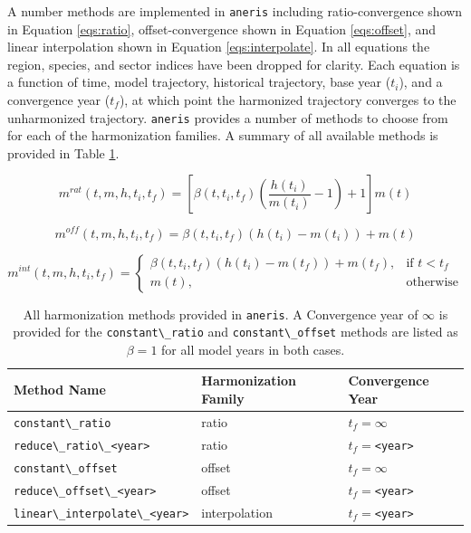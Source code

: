 \documentclass[review]{elsarticle}
\newcommand{\code}[1]{\lstinline[basicstyle=\ttfamily\color{black}]|#1|}
\newcommand{\codeb}[1]{\texttt{#1}}
\begin{document}
A number  methods are implemented in \code{aneris} including
ratio-convergence shown in Equation \ref{eqs:ratio}, offset-convergence shown in
Equation \ref{eqs:offset}, and linear interpolation shown in Equation
\ref{eqs:interpolate}. In all equations the region, species, and sector indices
have been dropped for clarity. Each equation is a function of time, model
trajectory, historical trajectory, base year ($t_i$), and a convergence year
($t_f$), at which point the harmonized trajectory converges to the unharmonized
trajectory. \codeb{aneris} provides a number of methods to choose from for each
of the harmonization families. A summary of all available methods is provided in
Table \ref{tab:meths}. 


\begin{equation}\label{eqs:ratio}
  m^{rat}(t, m, h, t_i, t_f) = [\beta(t, t_i, t_f) (\frac{h(t_i)}{m(t_i)} - 1) + 1] m(t)
\end{equation}

\begin{equation}\label{eqs:offset}
  m^{off}(t, m, h, t_i, t_f) = \beta(t, t_i, t_f) (h(t_i) - m(t_i)) + m(t)
\end{equation}
  
\begin{equation}\label{eqs:interpolate}
  m^{int}(t, m, h, t_i, t_f) =
  \begin{cases}
    \beta(t, t_i, t_f) (h(t_i) - m(t_f)) + m(t_f), & \text{if } t < t_f\\
    m(t), & \text{otherwise}
  \end{cases}
\end{equation}


\begin{table}[h!]
\centering
\caption{All harmonization methods provided in \code{aneris}. A Convergence year of $\infty$ is provided for the \code{constant\_ratio} and \code{constant\_offset} methods are listed as $\beta = 1$ for all model years in both cases.}
\label{tab:meths}
\begin{tabular}{|l|l|l|}
\hline
Method Name                             & Harmonization Family & Convergence Year\\
\hline
\code{constant\_ratio}                  & ratio              & $t_f = \infty$\\
\code{reduce\_ratio\_<year>}            & ratio              & $t_f = $\code{<year>}\\
\code{constant\_offset}                 & offset             & $t_f = \infty$\\
\code{reduce\_offset\_<year>}           & offset             & $t_f = $\code{<year>}\\
\code{linear\_interpolate\_<year>}      & interpolation      & $t_f = $\code{<year>}\\
\hline
\end{tabular}
\end{table}
\end{document}
